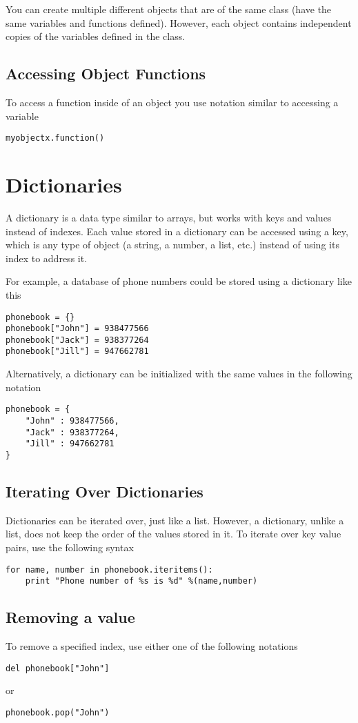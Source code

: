 \documentclass[a4paper,oneside]{book}
\numberwithin{equation}{chapter}
\begin{document}
You can create multiple different objects that are of the same class (have the same variables and functions defined). However, each object contains independent copies of the variables defined in the class.
\subsection{Accessing Object Functions}
To access a function inside of an object you use notation similar to accessing a variable
\begin{verbatim}
myobjectx.function()
\end{verbatim}
\section{Dictionaries}
A dictionary is a data type similar to arrays, but works with keys and values instead of indexes. Each value stored in a dictionary can be accessed using a key, which is any type of object (a string, a number, a list, etc.) instead of using its index to address it.

For example, a database of phone numbers could be stored using a dictionary like this
\begin{verbatim}
phonebook = {}
phonebook["John"] = 938477566
phonebook["Jack"] = 938377264
phonebook["Jill"] = 947662781
\end{verbatim}

Alternatively, a dictionary can be initialized with the same values in the following notation
\begin{verbatim}
phonebook = {
    "John" : 938477566,
    "Jack" : 938377264,
    "Jill" : 947662781
}
\end{verbatim}
\subsection{Iterating Over Dictionaries}
Dictionaries can be iterated over, just like a list. However, a dictionary, unlike a list, does not keep the order of the values stored in it. To iterate over key value pairs, use the following syntax
\begin{verbatim}
for name, number in phonebook.iteritems():
    print "Phone number of %s is %d" %(name,number)
\end{verbatim}
\subsection{Removing a value}
To remove a specified index, use either one of the following notations
\begin{verbatim}
del phonebook["John"]
\end{verbatim}
or
\begin{verbatim}
phonebook.pop("John")
\end{verbatim}
\end{document}
